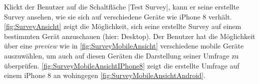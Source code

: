 Klickt der Benutzer auf die Schaltfläche \jinline|Test Survey|, kann er seine erstellte Survey ansehen, wie sie sich auf verschiedene Geräte wie \zb iPhone 8 verhält.
\abb \vref{fig:SurveyAnsicht} zeigt die Möglichkeit, sich seine erstellte Survey auf einem bestimmten Gerät  anzuschauen (hier: Desktop).  
Der Benutzer hat die Möglichkeit über eine \emph{preview} wie in \abb \vref{fig:SurveyMobileAnsicht} verschiedene mobile Geräte auszuwählen, um auch auf diesen Geräten die Darstellung seiner Umfrage zu überprüfen. 
\abb \vref{fig:SurveyMobileAnsichtIPhone8} zeigt die erstellte Umfrage auf einem iPhone 8 an wohingegen \abb \vref{fig:SurveyMobileAnsichtAndroid}. 


\begin{figure}[h]
	\centering
	\captionsetup{justification=centering, format=plain}
	\hfill
	\hfill
	\hfill

\end{figure}
